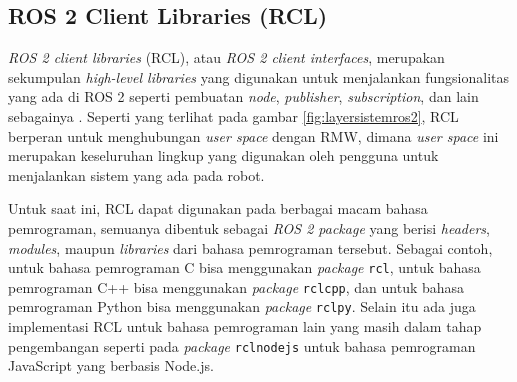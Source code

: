 \subsection{ROS 2 Client Libraries (RCL)}
\label{subsec:rcl}

\emph{ROS 2 client libraries} (RCL), atau \emph{ROS 2 client interfaces},
  merupakan sekumpulan \emph{high-level libraries} yang digunakan untuk menjalankan fungsionalitas yang ada di ROS 2 seperti pembuatan \emph{node}, \emph{publisher}, \emph{subscription}, dan lain sebagainya \citep{url:rclconcept}.
Seperti yang terlihat pada gambar \ref{fig:layersistemros2},
  RCL berperan untuk menghubungan \emph{user space} dengan RMW,
  dimana \emph{user space} ini merupakan keseluruhan lingkup yang digunakan oleh pengguna untuk menjalankan sistem yang ada pada robot.

Untuk saat ini, RCL dapat digunakan pada berbagai macam bahasa pemrograman,
  semuanya dibentuk sebagai \emph{ROS 2 package} yang berisi \emph{headers},
  \emph{modules}, maupun \emph{libraries} dari bahasa pemrograman tersebut.
Sebagai contoh, untuk bahasa pemrograman C bisa menggunakan \emph{package} \lstinline{rcl},
  untuk bahasa pemrograman C++ bisa menggunakan \emph{package} \lstinline{rclcpp},
  dan untuk bahasa pemrograman Python bisa menggunakan \emph{package} \lstinline{rclpy}.
Selain itu ada juga implementasi RCL untuk bahasa pemrograman lain yang masih dalam tahap pengembangan seperti pada \emph{package} \lstinline{rclnodejs} \citep{url:rclnodejs} untuk bahasa pemrograman JavaScript yang berbasis Node.js.
